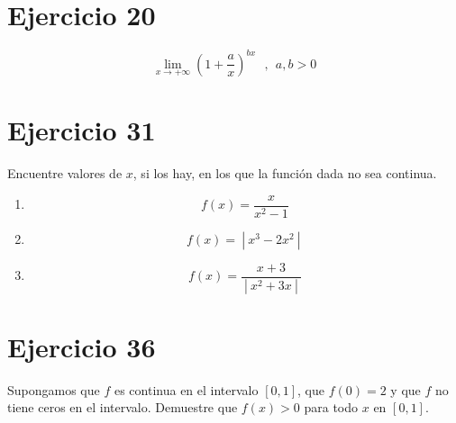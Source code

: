 \documentclass[12pt]{article}
\begin{document}
\section{Ejercicio 20}
\[
\lim_{x \to + \infty} (1+\frac{a}{x})^{bx} ~ ~ ~,~ ~ a,b>0
\]

\section{Ejercicio 31}
Encuentre valores de $x$, si los hay, en los que la función dada no sea continua.
\begin{enumerate}[label=(\alph*)]
\item \[ f(x)=\frac{x}{x^2-1} \]
\item \[ f(x)= ~|~ x^3-2x^2 ~|~ \]
\item \[ f(x)=\frac{x+3}{~|~ x^2+3x ~|~} \]
\end{enumerate}

\section{Ejercicio 36}
Supongamos que $f$ es continua en el intervalo $[0, 1]$, que $f(0) = 2$ y que $f$ no tiene ceros en el intervalo. Demuestre que $f(x) > 0$ para todo $x$ en $[0, 1]$.
\end{document}
